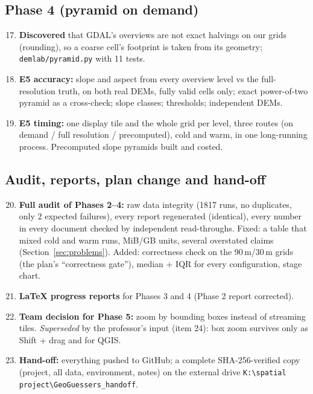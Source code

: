﻿\documentclass[11pt,a4paper]{article}
\newcommand{\code}[1]{\texttt{#1}}
\begin{document}
\subsection{Phase 4 (pyramid on demand)}
\begin{enumerate}
\setcounter{enumi}{16}
\item \textbf{Discovered} that GDAL's overviews are not exact halvings on our grids (rounding), so a coarse cell's
footprint is taken from its geometry; \code{demlab/pyramid.py} with 11 tests.
\item \textbf{E5 accuracy:} slope and aspect from every overview level vs the full-resolution truth, on both real DEMs,
fully valid cells only; exact power-of-two pyramid as a cross-check; slope classes; thresholds; independent DEMs.
\item \textbf{E5 timing:} one display tile and the whole grid per level, three routes (on demand / full resolution /
precomputed), cold and warm, in one long-running process. Precomputed slope pyramids built and costed.
\end{enumerate}

\subsection{Audit, reports, plan change and hand-off}
\begin{enumerate}
\setcounter{enumi}{19}
\item \textbf{Full audit of Phases 2--4:} raw data integrity (1817 runs, no duplicates, only 2 expected failures), every
report regenerated (identical), every number in every document checked by independent read-throughs. Fixed: a table
that mixed cold and warm runs, MiB/GB units, several overstated claims (Section~\ref{sec:problems}). Added: correctness
check on the 90\,m/30\,m grids (the plan's ``correctness gate''), median + IQR for every configuration, stage chart.
\item \textbf{LaTeX progress reports} for Phases 3 and 4 (Phase 2 report corrected).
\item \textbf{Team decision for Phase 5:} zoom by bounding boxes instead of streaming tiles. \emph{Superseded} by the
professor's input (item 24): box zoom survives only as Shift + drag and for QGIS.
\item \textbf{Hand-off:} everything pushed to GitHub; a complete SHA-256-verified copy (project, all data, environment,
notes) on the external drive \code{K:\textbackslash spatial project\textbackslash GeoGuessers\_handoff}.
\end{enumerate}
\end{document}
